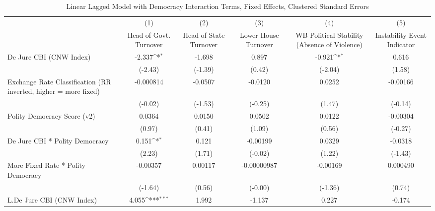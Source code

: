 {
\def\sym#1{\ifmmode^{#1}\else\(^{#1}\)\fi}
\begin{longtable}{l*{5}{c}}
\caption{Linear Lagged Model with Democracy Interaction Terms, Fixed Effects, Clustered Standard Errors \label{demintlagsDJ}}\\
\hline\hline\endfirsthead\hline\endhead\hline\endfoot\endlastfoot
                &\multicolumn{1}{c}{(1)}&\multicolumn{1}{c}{(2)}&\multicolumn{1}{c}{(3)}&\multicolumn{1}{c}{(4)}&\multicolumn{1}{c}{(5)}\\
                &\multicolumn{1}{c}{Head of Govt. Turnover}&\multicolumn{1}{c}{Head of State Turnover}&\multicolumn{1}{c}{Lower House Turnover}&\multicolumn{1}{c}{WB Political Stability (Absence of Violence)}&\multicolumn{1}{c}{Instability Event Indicator}\\
\hline
De Jure CBI (CNW Index)&   -2.337\sym{*}  &   -1.698         &    0.897         &   -0.921\sym{*}  &    0.616         \\
                &  (-2.43)         &  (-1.39)         &   (0.42)         &  (-2.04)         &   (1.58)         \\
[1em]
Exchange Rate Classification (RR inverted, higher = more fixed)&-0.000814         &  -0.0507         &  -0.0120         &   0.0252         & -0.00166         \\
                &  (-0.02)         &  (-1.53)         &  (-0.25)         &   (1.47)         &  (-0.14)         \\
[1em]
Polity Democracy Score (v2)&   0.0364         &   0.0150         &   0.0502         &   0.0122         & -0.00304         \\
                &   (0.97)         &   (0.41)         &   (1.09)         &   (0.56)         &  (-0.27)         \\
[1em]
De Jure CBI * Polity Democracy&    0.151\sym{*}  &    0.121         & -0.00199         &   0.0329         &  -0.0318         \\
                &   (2.23)         &   (1.71)         &  (-0.02)         &   (1.22)         &  (-1.43)         \\
[1em]
More Fixed Rate * Polity Democracy& -0.00357         &  0.00117         &-0.00000987         & -0.00169         & 0.000490         \\
                &  (-1.64)         &   (0.56)         &  (-0.00)         &  (-1.36)         &   (0.74)         \\
[1em]
L.De Jure CBI (CNW Index)&    4.055\sym{***}&    1.992         &   -1.137         &    0.227         &   -0.174         \\

\end{longtable}}
